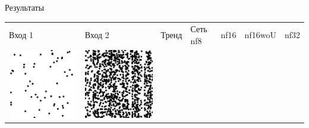 \documentclass[12pt]{beamer}
\begin{document}
	\begin{frame}{Результаты}
		\begin{table}
			\begin{center}
				\begin{tabular}{p{1.2cm} p{1.2cm} p{1.2cm} p{1.2cm} p{1.2cm} p{1.2cm} p{1.2cm}}
					\toprule
					Вход 1 & Вход 2 & Тренд & Сеть nf8 & nf16 & nf16woU & nf32 \\
					\cmidrule(r){1-1}\cmidrule(lr){2-2}\cmidrule(lr){3-3}\cmidrule(lr){4-4}\cmidrule(lr){5-5}\cmidrule(lr){6-6}\cmidrule(l){7-7}
					\includegraphics[width=1\linewidth]{8-results/sand-trend2/left1}
					&
					\includegraphics[width=1\linewidth]{8-results/sand-trend2/right1}

\end{tabular}
\end{center}
\end{table}
\end{frame}
\end{document}
